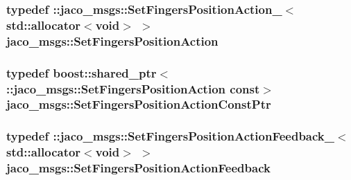 \subsubsection[{\texorpdfstring{Set\+Fingers\+Position\+Action}{SetFingersPositionAction}}]{\setlength{\rightskip}{0pt plus 5cm}typedef \+::{\bf jaco\+\_\+msgs\+::\+Set\+Fingers\+Position\+Action\+\_\+}$<$std\+::allocator$<$void$>$ $>$ {\bf jaco\+\_\+msgs\+::\+Set\+Fingers\+Position\+Action}}\hypertarget{namespacejaco__msgs_a6a86f786fe9f2e29693a22cec953c58c}{}\label{namespacejaco__msgs_a6a86f786fe9f2e29693a22cec953c58c}
\subsubsection[{\texorpdfstring{Set\+Fingers\+Position\+Action\+Const\+Ptr}{SetFingersPositionActionConstPtr}}]{\setlength{\rightskip}{0pt plus 5cm}typedef boost\+::shared\+\_\+ptr$<$ \+::{\bf jaco\+\_\+msgs\+::\+Set\+Fingers\+Position\+Action} const$>$ {\bf jaco\+\_\+msgs\+::\+Set\+Fingers\+Position\+Action\+Const\+Ptr}}\hypertarget{namespacejaco__msgs_a088ef72877eb1df1d472ecdd4d7fb9e6}{}\label{namespacejaco__msgs_a088ef72877eb1df1d472ecdd4d7fb9e6}
\subsubsection[{\texorpdfstring{Set\+Fingers\+Position\+Action\+Feedback}{SetFingersPositionActionFeedback}}]{\setlength{\rightskip}{0pt plus 5cm}typedef \+::{\bf jaco\+\_\+msgs\+::\+Set\+Fingers\+Position\+Action\+Feedback\+\_\+}$<$std\+::allocator$<$void$>$ $>$ {\bf jaco\+\_\+msgs\+::\+Set\+Fingers\+Position\+Action\+Feedback}}\hypertarget{namespacejaco__msgs_aa4016ccce3bffb26503e5b75be132b70}{}\label{namespacejaco__msgs_aa4016ccce3bffb26503e5b75be132b70}
